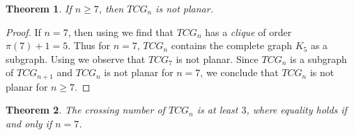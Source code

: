 \documentclass[12pt]{article}
\newtheorem{theorem}{Theorem}[section]
\begin{document}
	\begin{theorem}
		If $n\ge 7$, then $TCG_n$ is not planar.
	\end{theorem}
	
	\begin{proof}
		If $n=7$, then using  we find that  $TCG_n$ has a \textit{clique} of order $\pi(7)+1=5$.
		Thus for $n=7$, $TCG_n$ contains the complete graph $K_5$ as a subgraph.
		Using  we observe that $TCG_7$ is not planar.
		Since $TCG_n$ is a subgraph of $TCG_{n+1}$ and $TCG_n$ is not planar for $n=7$, we conclude that $TCG_n$ is not planar for $n\ge 7$.
	\end{proof}
	
	
	
	\begin{theorem}
		The crossing number of $TCG_n$ is at least $3$, where equality holds if and only if $n=7$.
	\end{theorem}
	
\end{document}
